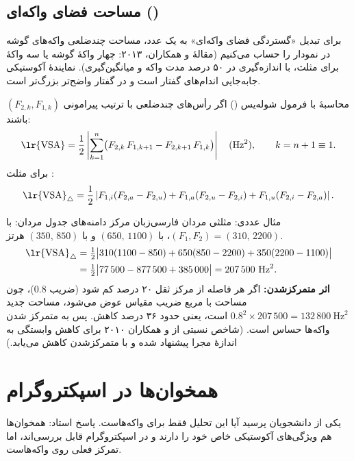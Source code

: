 \subsection{مساحت فضای واکه‌ای ()}
برای تبدیل «گستردگی فضای واکه‌ای» به یک عدد، مساحت چندضلعی واکه‌های گوشه در نمودار  را حساب می‌کنیم (مقالهٔ  و همکاران، ۲۰۱۳: چهار واکهٔ گوشه یا سه واکهٔ  برای مثلث، با اندازه‌گیری در ۵۰ درصد مدت واکه و میانگین‌گیری).  نمایندهٔ آکوستیکی جابه‌جایی اندام‌های گفتار است و در گفتار واضح‌تر بزرگ‌تر است.

\begin{definitionbox}{محاسبهٔ  با فرمول شوله‌یس ()}
اگر رأس‌های چندضلعی با ترتیب پیرامونی $(F_{2,k},F_{1,k})$ باشند:
\[
\text{\lr{VSA}}=\frac12\left|\sum_{k=1}^{n}\bigl(F_{2,k}\,F_{1,k+1}-F_{2,k+1}\,F_{1,k}\bigr)\right|\quad(\text{Hz}^2),\qquad k=n+1\equiv 1.
\]
برای مثلث :
\[
\text{\lr{VSA}}_{\triangle}=\frac12\left|F_{1,i}(F_{2,a}-F_{2,u})+F_{1,a}(F_{2,u}-F_{2,i})+F_{1,u}(F_{2,i}-F_{2,a})\right|.
\]
\end{definitionbox}

\begin{addedbox}{مثال عددی:  مثلثی مردان فارسی‌زبان}
مرکز دامنه‌های جدول مردان:  با $(F_1,F_2)=(310,\,2200)$،  با $(650,\,1100)$ و  با $(350,\,850)$ هرتز.
\begin{align*}
\text{\lr{VSA}}_{\triangle}&=\tfrac12\bigl|310(1100-850)+650(850-2200)+350(2200-1100)\bigr|\\
&=\tfrac12\bigl|77\,500-877\,500+385\,000\bigr|=207\,500\ \text{Hz}^2.
\end{align*}
\textbf{اثر متمرکزشدن:} اگر هر فاصله از مرکز ثقل ۲۰ درصد کم شود (ضریب $0.8$)، چون مساحت با مربع ضریب مقیاس عوض می‌شود، مساحت جدید $0.8^2\times207\,500=132\,800\ \text{Hz}^2$ است، یعنی حدود ۳۶ درصد کاهش. پس  به متمرکز شدن واکه‌ها حساس است. (شاخص نسبتی  از  و همکاران ۲۰۱۰ برای کاهش وابستگی به اندازهٔ مجرا پیشنهاد شده و با متمرکزشدن کاهش می‌یابد.)
\end{addedbox}

\section{همخوان‌ها در اسپکتروگرام}
یکی از دانشجویان پرسید آیا این تحلیل فقط برای واکه‌هاست. پاسخ استاد: همخوان‌ها هم ویژگی‌های آکوستیکی خاص خود را دارند و در اسپکتروگرام قابل بررسی‌اند، اما تمرکز فعلی روی واکه‌هاست.

